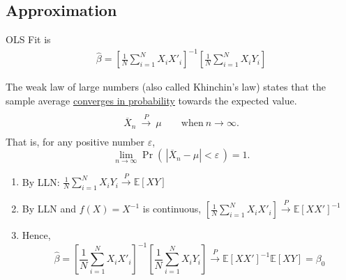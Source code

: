 \documentclass[11pt]{elegantbook}
\begin{document}
\subsection{Approximation}
OLS Fit is
\begin{equation}
    \begin{aligned}
        \hat{\beta}=\left[\frac{1}{N}\sum_{i=1}^N X_i X'_i\right]^{-1}\left[\frac{1}{N}\sum_{i=1}^N X_iY_i\right]
    \end{aligned}
    \nonumber
\end{equation}
\begin{theorem}
    The weak law of large numbers (also called Khinchin's law) states that the sample average \underline{converges in probability} towards the expected value.
    $${\displaystyle {\begin{matrix}{}\\{\overline {X}}_{n}\ {\xrightarrow {P}}\ \mu \qquad {\text{when}}\ n\to \infty .\\{}\end{matrix}}}$$
    That is, for any positive number $\varepsilon$,
    $${\displaystyle \lim _{n\to \infty }\Pr \!\left(\,|{\overline {X}}_{n}-\mu |<\varepsilon \,\right)=1.}$$
\end{theorem}
\begin{enumerate}
    \item By LLN: $\frac{1}{N}\sum_{i=1}^N X_iY_i\xrightarrow{P} \mathbb{E}[XY]$
    \item By LLN and $f(X)=X^{-1}$ is continuous, $\left[\frac{1}{N}\sum_{i=1}^N X_iX'_i\right]\xrightarrow{P} \mathbb{E}[XX']^{-1}$
    \item Hence, $$\hat{\beta}=\left[\frac{1}{N}\sum_{i=1}^N X_i X'_i\right]^{-1}\left[\frac{1}{N}\sum_{i=1}^N X_iY_i\right] \xrightarrow{P} \mathbb{E}[XX']^{-1}\mathbb{E}[XY]= \beta_0$$
\end{enumerate}
\end{document}
